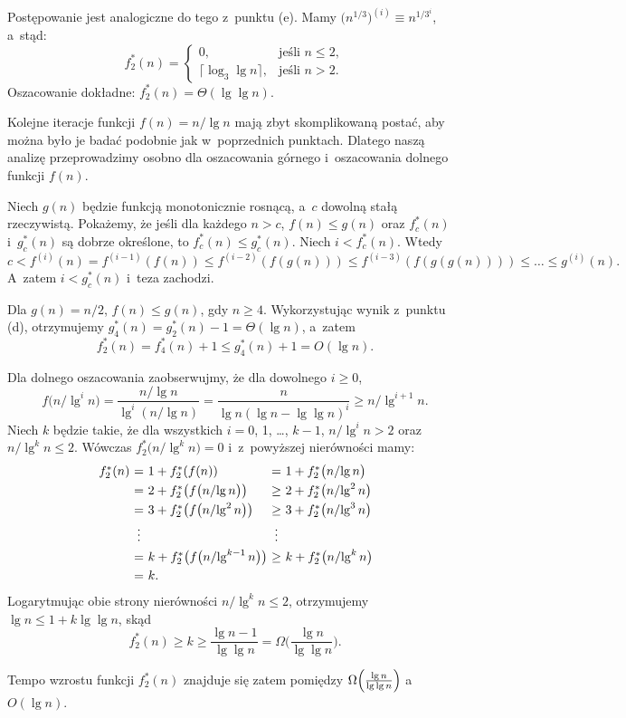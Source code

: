 \subproblem %
Postępowanie jest analogiczne do tego z~punktu (e).
Mamy $\bigl(n^{1/3}\bigr)^{(i)}\equiv n^{1/3^i}$, a~stąd:
\[
	f_2^*(n) =
	\begin{cases}
		0, & \text{jeśli $n\le2$}, \\
		\lceil\log_3\lg n\rceil, & \text{jeśli $n>2$}.
	\end{cases}
\]
Oszacowanie dokładne: $f_2^*(n)=\Theta(\lg\lg n)$.

\subproblem %
Kolejne iteracje funkcji $f(n)=n/\!\lg n$ mają zbyt skomplikowaną postać, aby można było je badać podobnie jak w~poprzednich punktach.
Dlatego naszą analizę przeprowadzimy osobno dla oszacowania górnego i~oszacowania dolnego funkcji $f(n)$.

Niech $g(n)$ będzie funkcją monotonicznie rosnącą, a~$c$ dowolną stałą rzeczywistą.
Pokażemy, że jeśli dla każdego $n>c$, $f(n)\le g(n)$ oraz $f_c^*(n)$ i~$g_c^*(n)$ są dobrze określone, to $f_c^*(n)\le g_c^*(n)$.
Niech $i<f_c^*(n)$.
Wtedy
\[
	c < f^{(i)}(n) = f^{(i-1)}(f(n)) \le f^{(i-2)}(f(g(n))) \le f^{(i-3)}(f(g(g(n)))) \le \dots \le g^{(i)}(n).
\]
A~zatem $i<g_c^*(n)$ i~teza zachodzi.

Dla $g(n)=n/2$, $f(n)\le g(n)$, gdy $n\ge4$.
Wykorzystując wynik z~punktu (d), otrzymujemy $g_4^*(n)=g_2^*(n)-1=\Theta(\lg n)$, a~zatem
\[
	f_2^*(n) = f_4^*(n)+1 \le g_4^*(n)+1 = O(\lg n).
\]

Dla dolnego oszacowania zaobserwujmy, że dla dowolnego $i\ge0$,
\[
	f\bigl(n/\!\lg^in\bigr) = \frac{n/\!\lg n}{\lg^i(n/\!\lg n)} = \frac{n}{\lg n(\lg n-\lg\lg n)^i} \ge n/\!\lg^{i+1}n.
\]
Niech $k$ będzie takie, że dla wszystkich $i=0$, 1, \dots, $k-1$, $n/\!\lg^in>2$ oraz $n/\!\lg^kn\le2$.
Wówczas $f_2^*\bigl(n/\!\lg^kn\bigr)=0$ i~z~powyższej nierówności mamy:
\[
	\begin{array}{l@{\ }c@{\ }l@{\ }c@{\ }l@{\ }}
	f_2^*(n) &=& 1+f_2^*(f(n)) &=& 1+f_2^*\bigl(n/\!\lg n\bigr) \\[1mm]
	&=& 2+f_2^*\bigl(f\bigl(n/\!\lg n\bigr)\bigr) &\ge& 2+f_2^*\bigl(n/\!\lg^2n\bigr) \\[1mm]
	&=& 3+f_2^*\bigl(f\bigl(n/\!\lg^2n\bigr)\bigr) &\ge& 3+f_2^*\bigl(n/\!\lg^3n\bigr) \\[1mm]
	&\vdots& &\vdots& \\[1mm]
	&=& k+f_2^*\bigl(f\bigl(n/\!\lg^{k-1}n\bigr)\bigr) &\ge& k+f_2^*\bigl(n/\!\lg^kn\bigr) \\[1mm]
	&=& k. &&
	\end{array}
\]
Logarytmując obie strony nierówności $n/\!\lg^kn\le2$, otrzymujemy $\lg n\le1+k\lg\lg n$, skąd
\[
	f_2^*(n) \ge k \ge \frac{\lg n-1}{\lg\lg n} = \Omega\biggl(\frac{\lg n}{\lg\lg n}\biggr).
\]

Tempo wzrostu funkcji $f_2^*(n)$ znajduje się zatem pomiędzy $\Omega\Bigl(\frac{\lg n}{\lg\lg n}\Bigr)$ a~$O(\lg n)$.
